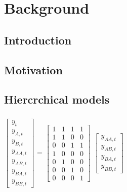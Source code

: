 	
\chapter{Background}
	
	\section{Introduction}
	\section{Motivation}
	

	\section{Hiercrchical models}
	
		\paragraph{}
		
\begin{center}
$\begin{bmatrix}
	y_{t} \\
	y_{A,t}\\
	y_{B,t} \\
	y_{AA,t} \\
	y_{AB,t}\\
	y_{BA,t} \\
	y_{BB,t}
\end{bmatrix}$
=
$\begin{bmatrix}
	1 & 1 & 1 & 1 \\
	1 & 1 & 0 & 0 \\
	0 & 0 & 1 & 1 \\
	1  & 0  & 0  & 0  \\
	0  & 1  & 0  & 0  \\
	0  & 0  & 1  & 0  \\
	0  & 0  & 0  & 1
\end{bmatrix}$
$\begin{bmatrix}
	y_{AA,t} \\
	y_{AB,t} \\
	y_{BA,t} \\
	y_{BB,t}
\end{bmatrix}$
\end{center}


